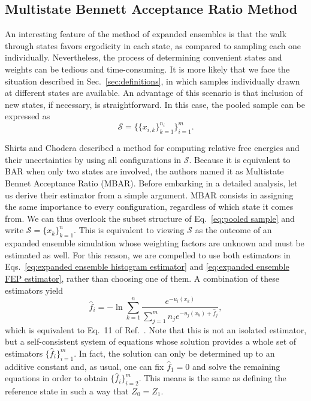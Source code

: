 \documentclass[aip,jcp,preprint,amsmath,amssymb]{revtex4-1}
\begin{document}
\subsection{Multistate Bennett Acceptance Ratio Method}

An interesting feature of the method of expanded ensembles is that the walk through states favors ergodicity in each state, as compared to sampling each one individually. Nevertheless, the process of determining convenient states and weights can be tedious and time-consuming. It is more likely that we face the situation described in Sec.~\ref{sec:definitions}, in which samples individually drawn at different states are available. An advantage of this scenario is that inclusion of new states, if necessary, is straightforward. In this case, the pooled sample can be expressed as
\begin{equation}
\label{eq:pooled sample}
\mathcal S = \Big\{\{x_{i,k}\}_{k=1}^{n_i}\Big\}_{i=1}^m.
\end{equation}

Shirts and Chodera\cite{Shirts_2008} described a method for computing relative free energies and their uncertainties by using all configurations in $\mathcal S$. Because it is equivalent to BAR when only two states are involved, the authors named it as Multistate Bennet Acceptance Ratio (MBAR). Before embarking in a detailed analysis, let us derive their estimator from a simple argument. MBAR consists in assigning the same importance to every configuration, regardless of which state it comes from. We can thus overlook the subset structure of Eq.~\eqref{eq:pooled sample} and write $\mathcal S = \{x_k\}_{k=1}^n$. This is equivalent to viewing $\mathcal S$ as the outcome of an expanded ensemble simulation whose weighting factors are unknown and must be estimated as well. For this reason, we are compelled to use both estimators in Eqs.~\eqref{eq:expanded ensemble histogram estimator} and \eqref{eq:expanded ensemble FEP estimator}, rather than choosing one of them. A combination of these estimators yield
\begin{equation}
\label{eq:mbar free energy estimator}
\hat f_i = -\ln \sum_{k=1}^n \frac{e^{-u_i(x_k)}}{\sum_{j=1}^m n_j e^{-u_j(x_k) + \hat f_j}},
\end{equation}
which is equivalent to Eq.~11 of Ref.~. Note that this is not an isolated estimator, but a self-consistent system of equations whose solution provides a whole set of estimators $\{\hat f_i\}_{i=1}^m$. In fact, the solution can only be determined up to an additive constant and, as usual, one can fix $\hat f_1 = 0$ and solve the remaining equations in order to obtain $\{\hat f_i\}_{i=2}^m$. This means is the same as defining the reference state in such a way that $Z_0 = Z_1$.
\end{document}
